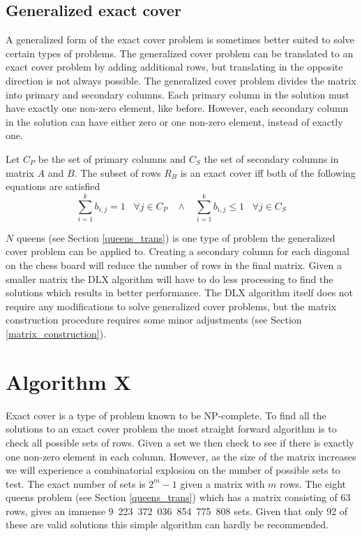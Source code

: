 \subsection{Generalized exact cover}

A generalized form of the exact cover problem is sometimes better suited to solve certain types of problems.
The generalized cover problem can be translated to an exact cover problem by adding additional rows, but translating in the opposite direction is not always possible.
The generalized cover problem divides the matrix into primary and secondary columns.
Each primary column in the solution must have exactly one non-zero element, like before.
However, each secondary column in the solution can have either zero or one non-zero element, instead of exactly one.

Let $C_P$ be the set of primary columns and $C_S$ the set of secondary columns in matrix $A$ and $B$.
The subset of rows $R_B$ is an exact cover iff both of the following equations are satisfied
\[
	\sum_{i = 1}^{k} b_{i,j} = 1 \;\;\; \forall j \in C_P  \;\;\; \wedge \;\;\;  \sum_{i = 1}^{k} b_{i,j} \leq 1 \;\;\; \forall j \in C_S
\]


$N$ queens (see Section \ref{queens_trans}) is one type of problem the generalized cover problem can be applied to.
Creating a secondary column for each diagonal on the chess board will reduce the number of rows in the final matrix.
Given a smaller matrix the DLX algorithm will have to do less processing to find the solutions which results in better performance.
The DLX algorithm itself does not require any modifications to solve generalized cover problems, but the matrix construction procedure requires some minor adjustments (see Section \ref{matrix_construction}).



\section{Algorithm X}
\label{algox}

Exact cover is a type of problem known to be NP-complete.
To find all the solutions to an exact cover problem the most straight forward algorithm is to check all possible sets of rows.
Given a set we then check to see if there is exactly one non-zero element in each column.
However, as the size of the matrix increases we will experience a combinatorial explosion on the number of possible sets to test.
The exact number of sets is $2^{m}-1$ given a matrix with $m$ rows.
The eight queens problem (see Section \ref{queens_trans}) which has a matrix consisting of 63 rows, gives an immense 9~223~372~036~854~775~808 sets.
Given that only 92 of these are valid solutions this simple algorithm can hardly be recommended.

